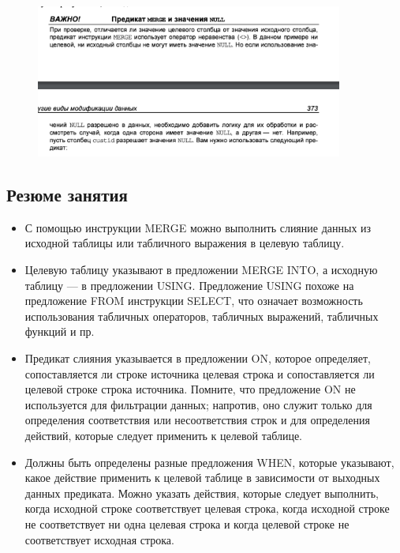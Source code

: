\begin{figure}[h!]
	\begin{center}
		\includegraphics[width=0.9\textwidth]{img/control25.png}
	\end{center}
	\captionsetup{justification=centering}
\end{figure}
		
\subsection*{Резюме занятия}
\begin{itemize}
	\item С помощью инструкции MERGE можно выполнить слияние данных из исходной
	таблицы или табличного выражения в целевую таблицу. 
	\item Целевую таблицу указывают в предложении MERGE INTO, а исходную таблицу —
	в предложении USING. Предложение USING похоже на предложение FROM инструкции SELECT, что означает возможность использования табличных операторов,
	табличных выражений, табличных функций и пр. 
	\item Предикат слияния указывается в предложении ON, которое определяет, сопоставляется ли строке источника целевая строка и сопоставляется ли целевой строке
	строка источника. Помните, что предложение ON не используется для фильтрации данных; напротив, оно служит только для определения соответствия или несоответствия строк и для определения действий, которые следует применить
	к целевой таблице.
	\item Должны быть определены разные предложения WHEN, которые указывают, какое
	действие применить к целевой таблице в зависимости от выходных данных предиката. Можно указать действия, которые следует выполнить, когда исходной
	строке соответствует целевая строка, когда исходной строке не соответствует ни
	одна целевая строка и когда целевой строке не соответствует исходная строка. 
\end{itemize}


